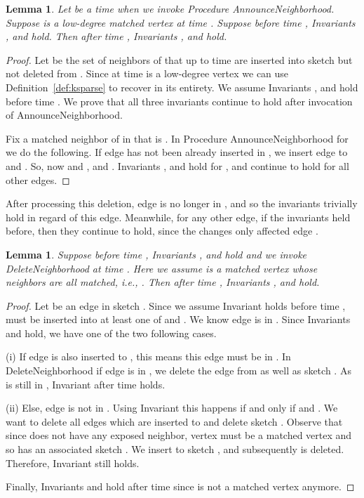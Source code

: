 \documentclass[11pt,letter]{article}
\newtheorem{lemma}[theorem]{Lemma}
\begin{document}
\begin{lemma}
\label{lem:timestamps:case:4}
Let  be a time when we invoke Procedure {\sf AnnounceNeighborhood}.
Suppose  is a low-degree matched vertex at time .
Suppose before time , Invariants ,  and  hold.
Then after time , Invariants ,  and  hold.
\end{lemma}

\begin{proof}
Let  be the set of neighbors of  that up to time 
are inserted into sketch  but not deleted from .
Since  at time  is a low-degree vertex we can use
Definition~\ref{def:ksparse} to recover  in its entirety.
We assume Invariants ,  and  hold before time .
We prove that all three invariants continue to hold after invocation of
{\sf AnnounceNeighborhood}.

Fix a matched neighbor  of  in  that is
. In Procedure
{\sf AnnounceNeighborhood} for  we do the following.
If edge  has not been already inserted in ,
we insert edge  to  and .
So, now  and , and
. Invariants ,  and  hold for ,
and continue to hold for all other edges.
\end{proof}

After processing this deletion, edge  is no longer in ,
and so the invariants trivially hold in regard of this edge.
Meanwhile, for any other edge, if the invariants held before, then
they continue to hold, since the changes only affected edge .



\begin{lemma}
\label{lem:timestamps:case:5}
Suppose before time , Invariants ,  and  hold and we
invoke {\sf DeleteNeighborhood} at time .
Here we assume  is a matched vertex whose neighbors are all matched, i.e.,
.
Then after time , Invariants ,  and  hold.
\end{lemma}

\begin{proof}
Let  be an edge in sketch .
Since we assume Invariant  holds before time ,  must be
inserted into at least one of  and . We know edge  is in .
Since Invariants  and  hold, we have one of the two following cases.

(i) If edge  is also inserted to , this means this edge must be in .
In {\sf DeleteNeighborhood} if edge  is in ,
we delete the edge from  as well as sketch .
As  is still in , Invariant  after time  holds.

(ii) Else, edge  is not in . Using Invariant  this happens
if and only if  and .
We want to delete all edges which are inserted to  and delete sketch .
Observe that since  does not have
any exposed neighbor, vertex  must be a matched vertex and so has
an associated sketch .
We insert  to sketch , and
subsequently  is deleted.
Therefore, Invariant  still holds.

Finally, Invariants  and  hold after time  since 
is not a matched vertex anymore.
\end{proof}
\end{document}
